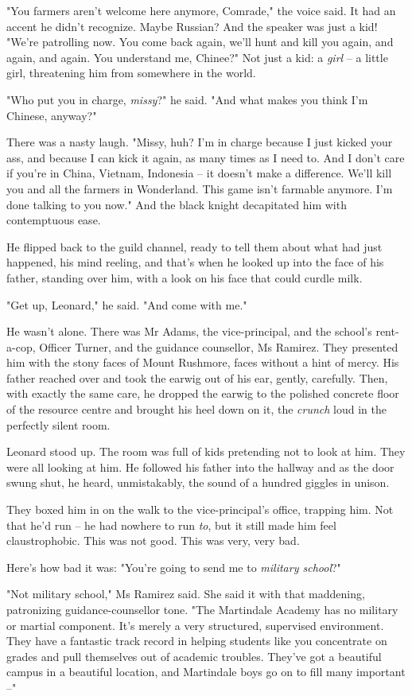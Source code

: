 "You farmers aren't welcome here anymore, Comrade," the voice said.
It had an accent he didn't recognize. Maybe Russian? And the
speaker was just a kid! "We're patrolling now. You come back again,
we'll hunt and kill you again, and again, and again. You understand
me, Chinee?" Not just a kid: a \emph{girl} -- a little girl,
threatening him from somewhere in the world.

"Who put you in charge, \emph{missy}?" he said. "And what makes you
think I'm Chinese, anyway?"

There was a nasty laugh. "Missy, huh? I'm in charge because I just
kicked your ass, and because I can kick it again, as many times as
I need to. And I don't care if you're in China, Vietnam, Indonesia
-- it doesn't make a difference. We'll kill you and all the farmers
in Wonderland. This game isn't farmable anymore. I'm done talking
to you now." And the black knight decapitated him with contemptuous
ease.

He flipped back to the guild channel, ready to tell them about what
had just happened, his mind reeling, and that's when he looked up
into the face of his father, standing over him, with a look on his
face that could curdle milk.

"Get up, Leonard," he said. "And come with me."

He wasn't alone. There was Mr Adams, the vice-principal, and the
school's rent-a-cop, Officer Turner, and the guidance counsellor,
Ms Ramirez. They presented him with the stony faces of Mount
Rushmore, faces without a hint of mercy. His father reached over
and took the earwig out of his ear, gently, carefully. Then, with
exactly the same care, he dropped the earwig to the polished
concrete floor of the resource centre and brought his heel down on
it, the \emph{crunch} loud in the perfectly silent room.

Leonard stood up. The room was full of kids pretending not to look
at him. They were all looking at him. He followed his father into
the hallway and as the door swung shut, he heard, unmistakably, the
sound of a hundred giggles in unison.

They boxed him in on the walk to the vice-principal's office,
trapping him. Not that he'd run -- he had nowhere to run \emph{to},
but it still made him feel claustrophobic. This was not good. This
was very, very bad.

Here's how bad it was: "You're going to send me to
\emph{military school}?"

"Not military school," Ms Ramirez said. She said it with that
maddening, patronizing guidance-counsellor tone. "The Martindale
Academy has no military or martial component. It's merely a very
structured, supervised environment. They have a fantastic track
record in helping students like you concentrate on grades and pull
themselves out of academic troubles. They've got a beautiful campus
in a beautiful location, and Martindale boys go on to fill many
important --"

